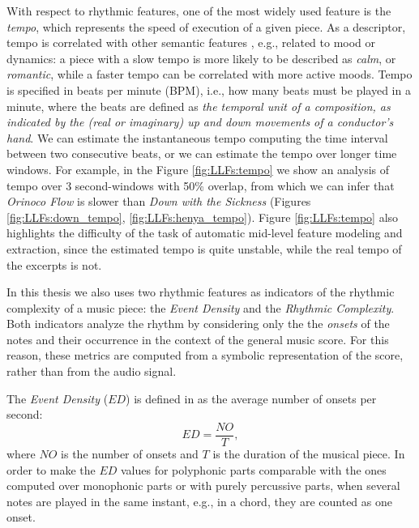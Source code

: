With respect to rhythmic features, one of the most widely used feature is the \textit{tempo}, which represents the speed of execution of a given piece. As a descriptor, tempo is correlated with other semantic features \cite{Buccoli2013}, e.g., related to mood or dynamics: a piece with a slow tempo is more likely to be described as \textit{calm}, or \textit{romantic}, while a faster tempo can be correlated with more active moods. Tempo is specified in beats per minute (BPM), i.e., how many beats must be played in a minute, where the beats are defined as  \textit{the temporal unit of a composition, as indicated by the (real or imaginary) up and down movements of a conductor's hand}\cite{harvardDictionary}. We can estimate the instantaneous tempo computing the time interval between two consecutive beats, or we can estimate the tempo over longer time windows. For example, in the Figure \ref{fig:LLFs:tempo} we show an analysis of tempo over 3 second-windows with 50\% overlap, from which we can infer that \textit{Orinoco Flow} is slower than \textit{Down with the Sickness} (Figures \ref{fig:LLFs:down_tempo}, \ref{fig:LLFs:henya_tempo}). Figure \ref{fig:LLFs:tempo} also highlights the difficulty of the task of automatic mid-level feature modeling and extraction, since the estimated tempo is quite unstable, while the real tempo of the excerpts is not. 

In this thesis we also uses two rhythmic features as indicators of the rhythmic complexity of a music piece: the \textit{Event Density} and the \textit{Rhythmic Complexity}. Both indicators analyze the rhythm by considering only the the \textit{onsets} of the notes and their occurrence in the context of the general music score. For this reason, these metrics are computed from a symbolic representation of the score, rather than from the audio signal. 

The \textit{Event Density} ($ED$) is defined in \cite{Lartillot2007} as the average number of onsets per second:
\begin{equation}
ED = \frac{NO}{T},
\label{eq:LLFs:ED}
\end{equation}
where $NO$ is the number of onsets and $T$ is the duration of the musical piece. In order to 
make the $ED$ values for polyphonic parts comparable with the ones computed over monophonic parts or with purely percussive parts, when several notes are played in the same instant, e.g., in a chord, they are counted as one onset.  

